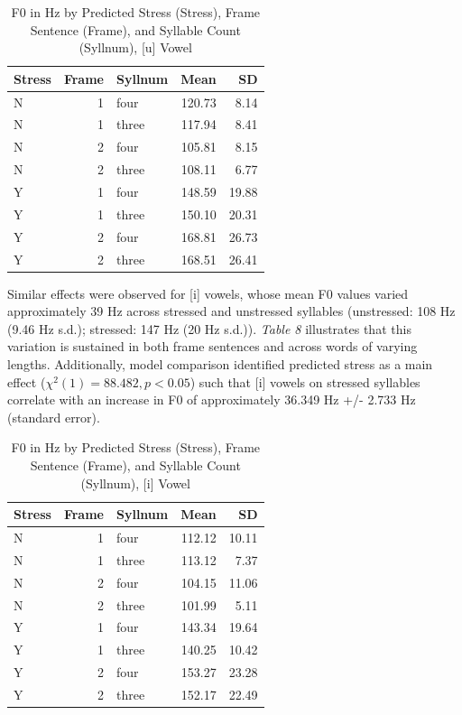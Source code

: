 \documentclass[english,man]{apa6}
\theoremstyle{definition}
\theoremstyle{definition}
\theoremstyle{definition}
\theoremstyle{remark}
\begin{document}
\begin{table}

\caption{\label{tab:Table7}F0 in Hz by Predicted Stress (Stress), Frame Sentence (Frame), and Syllable Count (Syllnum), [u] Vowel}
\centering
\begin{tabular}[t]{l|r|l|r|r}
\hline
Stress & Frame & Syllnum & Mean & SD\\
\hline
N & 1 & four & 120.73 & 8.14\\
\hline
N & 1 & three & 117.94 & 8.41\\
\hline
N & 2 & four & 105.81 & 8.15\\
\hline
N & 2 & three & 108.11 & 6.77\\
\hline
Y & 1 & four & 148.59 & 19.88\\
\hline
Y & 1 & three & 150.10 & 20.31\\
\hline
Y & 2 & four & 168.81 & 26.73\\
\hline
Y & 2 & three & 168.51 & 26.41\\
\hline
\end{tabular}
\end{table}

Similar effects were observed for {[}i{]} vowels, whose mean F0 values
varied approximately 39 Hz across stressed and unstressed syllables
(unstressed: 108 Hz (9.46 Hz s.d.); stressed: 147 Hz (20 Hz s.d.)).
\textit{Table 8} illustrates that this variation is sustained in both
frame sentences and across words of varying lengths. Additionally, model
comparison identified predicted stress as a main effect
(\(\chi^2(1) = 88.482, p < 0.05\)) such that {[}i{]} vowels on stressed
syllables correlate with an increase in F0 of approximately 36.349 Hz
+/- 2.733 Hz (standard error).

\begin{table}

\caption{\label{tab:Table8}F0 in Hz by Predicted Stress (Stress), Frame Sentence (Frame), and Syllable Count (Syllnum), [i] Vowel}
\centering
\begin{tabular}[t]{l|r|l|r|r}
\hline
Stress & Frame & Syllnum & Mean & SD\\
\hline
N & 1 & four & 112.12 & 10.11\\
\hline
N & 1 & three & 113.12 & 7.37\\
\hline
N & 2 & four & 104.15 & 11.06\\
\hline
N & 2 & three & 101.99 & 5.11\\
\hline
Y & 1 & four & 143.34 & 19.64\\
\hline
Y & 1 & three & 140.25 & 10.42\\
\hline
Y & 2 & four & 153.27 & 23.28\\
\hline
Y & 2 & three & 152.17 & 22.49\\
\hline
\end{tabular}
\end{table}
\end{document}
